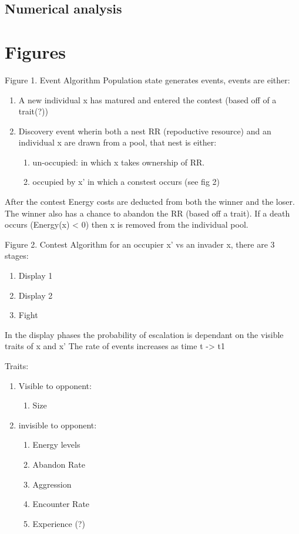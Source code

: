 \documentclass[a4paper,11pt]{article}
\begin{document}
\subsection{Numerical analysis}

\section{Figures}
Figure 1. Event Algorithm
Population state generates events, events are either:
\begin{enumerate}
    \item A new individual x has matured and entered the contest (based off of a trait(?))
    \item Discovery event wherin both a nest RR (repoductive resource) and an individual x are drawn from a pool, that nest is either:
\begin{enumerate}
    \item un-occupied: in which x takes ownership of RR.
    \item occupied by x' in which a constest occurs (see fig 2)
\end{enumerate}
\end{enumerate}
After the contest Energy costs are deducted from both the winner and the loser.
The winner also has a chance to abandon the RR (based off a trait).
If a death occurs (Energy(x) < 0) then x is removed from the individual pool.


Figure 2. Contest Algorithm
for an occupier x' vs an invader x, there are 3 stages:
\begin{enumerate}
    \item Display 1
    \item Display 2
    \item Fight
\end{enumerate}
In the display phases the probability of escalation is dependant on the visible traits of x and x'
The rate of events increases as time t -> t1

Traits:
\begin{enumerate}
    \item Visible to opponent:
\begin{enumerate}
    \item Size
\end{enumerate}
    \item invisible to opponent:
\begin{enumerate}
    \item Energy levels
    \item Abandon Rate
    \item Aggression
    \item Encounter Rate
    \item Experience (?)
\end{enumerate}
\end{enumerate}
\end{document}
